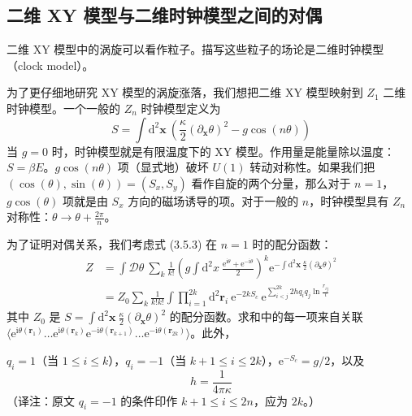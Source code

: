 \subsection{二维 XY 模型与二维时钟模型之间的对偶}
\begin{keypoints}
\item 二维 XY 模型中的涡旋可以看作粒子。描写这些粒子的场论是二维时钟模型（clock model）。
\end{keypoints}

为了更仔细地研究 XY 模型的涡旋涨落，我们想把二维 XY 模型映射到 $Z_{1}$ 二维时钟模型。一个一般的 $Z_{n}$ 时钟模型定义为
\begin{equation*}
S = \int \mathrm{d}^{2}\pmb{x}\ \left( \frac{\kappa}{2}(\partial_{\pmb{x}}\theta)^{2} - g\cos(n\theta) \right)
\tag{3.5.3}
\end{equation*}
当 $g = 0$ 时，时钟模型就是有限温度下的 XY 模型。作用量是能量除以温度：$S = \beta E$。$g\cos(n\theta)$ 项（显式地）破坏 $U(1)$ 转动对称性。如果我们把 $(\cos(\theta), \sin(\theta)) = (S_{x}, S_{y})$ 看作自旋的两个分量，那么对于 $n = 1$，$g\cos(\theta)$ 项就是由 $S_{x}$ 方向的磁场诱导的项。对于一般的 $n$，时钟模型具有 $Z_{n}$ 对称性：$\theta \to \theta + \frac{2\pi}{n}$。

为了证明对偶关系，我们考虑式 (3.5.3) 在 $n = 1$ 时的配分函数：
\begin{equation*}
\begin{aligned}
Z &= \int \mathcal{D}\theta\ \sum_{k} \frac{1}{k!}\left( g\int \mathrm{d}^{2}x\ \frac{\mathrm{e}^{\mathrm{i}\theta} + \mathrm{e}^{-\mathrm{i}\theta}}{2} \right)^{k} \mathrm{e}^{-\int \mathrm{d}^{2}\pmb{x}\ \frac{\kappa}{2}(\partial_{\pmb{x}}\theta)^{2}} \\
&= Z_{0} \sum_{k} \frac{1}{k!k!} \int \prod_{i=1}^{2k} \mathrm{d}^{2}\pmb{r}_{i}\ \mathrm{e}^{-2kS_{c}}\ \mathrm{e}^{\sum_{i<j}^{2k} 2hq_{i}q_{j}\ln\frac{r_{ij}}{l}}
\end{aligned}
\tag{3.5.4}
\end{equation*}
其中 $Z_{0}$ 是 $S = \int \mathrm{d}^{2}\pmb{x}\ \frac{\kappa}{2}(\partial_{\pmb{x}}\theta)^{2}$ 的配分函数。求和中的每一项来自关联 $\langle \mathrm{e}^{\mathrm{i}\theta(\pmb{r}_{1})}\allowbreak\ldots\allowbreak\mathrm{e}^{\mathrm{i}\theta(\pmb{r}_{k})}\allowbreak\mathrm{e}^{-\mathrm{i}\theta(\pmb{r}_{k+1})}\allowbreak\ldots\allowbreak\mathrm{e}^{-\mathrm{i}\theta(\pmb{r}_{2k})}\rangle$。此外，

$q_{i} = 1$（当 $1 \leqslant i \leqslant k$），$q_{i} = -1$（当 $k+1 \leqslant i \leqslant 2k$），$\mathrm{e}^{-S_{c}} = g/2$，以及
\begin{equation*}
h = \frac{1}{4\pi\kappa}
\end{equation*}
（译注：原文 $q_{i} = -1$ 的条件印作 $k+1 \leqslant i \leqslant 2n$，应为 $2k$。）

